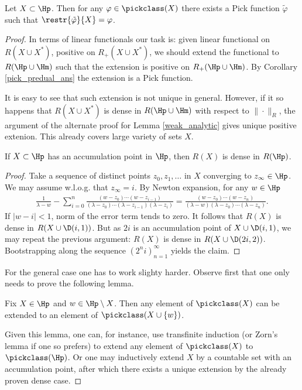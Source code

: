 \begin{lause}\label{pick_interpolation}
	Let $X \subset \Hp$. Then for any $\varphi \in \pickclass(X)$ there exists a Pick function $\tilde{\varphi}$ such that $\restr{\tilde{\varphi}}{X} = \varphi$.
\end{lause}

\begin{proof}
	In terms of linear functionals our task is: given linear functional on $R(X \cup X^{*})$, positive on $R_{+}(X \cup X^{*})$, we should extend the functional to $R(\Hp \cup \Hm)$ such that the extension is positive on $R_{+}(\Hp \cup \Hm)$. By Corollary \ref{pick_predual_ans} the extension is a Pick function.

	It is easy to see that such extension is not unique in general. However, if it so happens that $R(X \cup X^{*})$ is dense in $R(\Hp \cup \Hm)$ with respect to $\|\cdot\|_{R}$, the argument of the alternate proof for Lemma \ref{weak_analytic} gives unique positive extenion. This already covers large variety of sets $X$.
	\begin{lem}\label{pick_dual_dense}
		If $X \subset \Hp$ has an accumulation point in $\Hp$, then $R(X)$ is dense in $R(\Hp)$.
	\end{lem}
	\begin{proof}
		Take a sequence of distinct points $z_{0}, z_{1}, \ldots$ in $X$ converging to $z_{\infty} \in \Hp$. We may assume w.l.o.g. that $z_{\infty} = i$. By Newton expansion, for any $w \in \Hp$
		\begin{align*}
			\frac{1}{\lambda - w} - \sum_{i = 0}^{n} \frac{(w - z_{0}) \cdots (w - z_{i - 1})}{(\lambda - z_{0}) \cdots (\lambda - z_{i - 1}) (\lambda - z_{i})} = \frac{(w - z_{0}) \cdots (w - z_{n})}{(\lambda - w)(\lambda - z_{0}) \cdots (\lambda - z_{n})}.
		\end{align*}
		If $|w - i| < 1$, norm of the error term tends to zero. It follows that $R(X)$ is dense in $R(X \cup \D(i, 1))$. But as $2 i$ is an accumulation point of $X \cup \D(i, 1)$, we may repeat the previous argument: $R(X)$ is dense in $R(X \cup \D(2 i, 2))$. Bootstrapping along the sequence $(2^{n} i)_{n = 1}^{\infty}$ yields the claim.
	\end{proof}

	For the general case one has to work slighty harder. Observe first that one only needs to prove the following lemma.
	\begin{lem}\label{pick_one_point_extension}
		Fix $X \in \Hp$ and $w \in \Hp \setminus X$. Then any element of $\pickclass(X)$ can be extended to an element of $\pickclass(X \cup \{w\})$.
	\end{lem}
	Given this lemma, one can, for instance, use transfinite induction (or Zorn's lemma if one so prefers) to extend any element of $\pickclass(X)$ to $\pickclass(\Hp)$. Or one may inductively extend $X$ by a countable set with an accumulation point, after which there exists a unique extension by the already proven dense case.


\end{proof}
